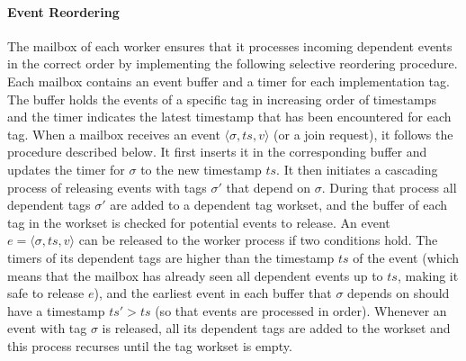 

\paragraph{Event Reordering}
%
The mailbox of each worker ensures that it processes incoming
dependent events in the correct order by implementing the following
selective reordering procedure. Each mailbox contains an event buffer
and a timer for each implementation tag. The buffer holds the events
of a specific tag in increasing order of timestamps and the timer
indicates the latest timestamp that has been encountered for each tag.
When a mailbox receives an event $\langle \sigma, ts, v \rangle$ (or a
join request), it follows the procedure described below. It first
inserts it in the corresponding buffer and updates the timer for
$\sigma$ to the new timestamp $ts$. It then initiates a
cascading process of releasing events with tags $\sigma'$ that depend
on $\sigma$. During that process all dependent tags $\sigma'$ are
added to a dependent tag workset, and the buffer of each tag in the
workset is checked for potential events to release. An event $e =
\langle \sigma, ts, v \rangle$ can be released to the worker process
if two conditions hold. The timers of its dependent tags are higher
than the timestamp $ts$ of the event (which means that the mailbox has
already seen all dependent events up to $ts$, making it safe to
release $e$), and the earliest event in each buffer that $\sigma$
depends on should have a timestamp $ts' > ts$ (so that events are
processed in order). Whenever an event with tag $\sigma$ is released,
all its dependent tags are added to the workset and this process
recurses until the tag workset is empty.


